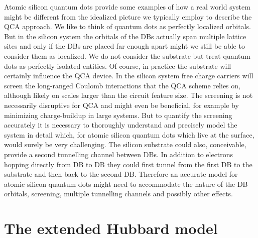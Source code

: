 Atomic silicon quantum dots provide some examples of how a real world system
might be different from the idealized picture we typically employ to describe
the QCA approach. We like to think of quantum dots as perfectly localized
orbitals. But in the silicon system the orbitals of the DBs actually span
multiple lattice sites and only if the DBs are placed far enough apart might we
still be able to consider them as localized. We do not consider the substrate
but treat quantum dots as perfectly isolated entities. Of course, in practice
the substrate will certainly influence the QCA device. In the silicon system
free charge carriers will screen the long-ranged Coulomb interactions that the
QCA scheme relies on, although likely on scales larger than the circuit feature
size. The screening is not necessarily disruptive for QCA and
might even be beneficial, for example by minimizing charge-buildup in large
systems. But to quantify the screening accurately it is necessary to thoroughly
understand and precisely model the system in detail which, for atomic silicon
quantum dots which live at the surface, would surely be very challenging. The
silicon substrate could also, conceivable, provide a second tunnelling channel
between DBs. In addition to electrons hopping directly from DB to DB they could
first tunnel from the first DB to the substrate and then back to the second DB.
Therefore an accurate model for atomic silicon quantum dots might need to
accommodate the nature of the DB orbitals, screening, multiple tunnelling
channels and possibly other effects.


\section{The extended Hubbard model}

